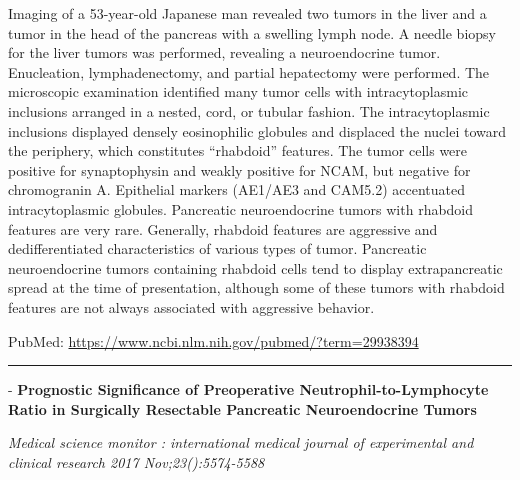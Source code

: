 \documentclass[]{article}
\begin{document}
Imaging of a 53-year-old Japanese man revealed two tumors in the liver
and a tumor in the head of the pancreas with a swelling lymph node. A
needle biopsy for the liver tumors was performed, revealing a
neuroendocrine tumor. Enucleation, lymphadenectomy, and partial
hepatectomy were performed. The microscopic examination identified many
tumor cells with intracytoplasmic inclusions arranged in a nested, cord,
or tubular fashion. The intracytoplasmic inclusions displayed densely
eosinophilic globules and displaced the nuclei toward the periphery,
which constitutes ``rhabdoid'' features. The tumor cells were positive
for synaptophysin and weakly positive for NCAM, but negative for
chromogranin A. Epithelial markers (AE1/AE3 and CAM5.2) accentuated
intracytoplasmic globules. Pancreatic neuroendocrine tumors with
rhabdoid features are very rare. Generally, rhabdoid features are
aggressive and dedifferentiated characteristics of various types of
tumor. Pancreatic neuroendocrine tumors containing rhabdoid cells tend
to display extrapancreatic spread at the time of presentation, although
some of these tumors with rhabdoid features are not always associated
with aggressive behavior.

PubMed: \url{https://www.ncbi.nlm.nih.gov/pubmed/?term=29938394}

{}

{}

\begin{center}\rule{0.5\linewidth}{\linethickness}\end{center}

 - \textbf{Prognostic Significance of Preoperative
Neutrophil-to-Lymphocyte Ratio in Surgically Resectable Pancreatic
Neuroendocrine Tumors}

\emph{Medical science monitor : international medical journal of
experimental and clinical research 2017 Nov;23():5574-5588}
\end{document}
